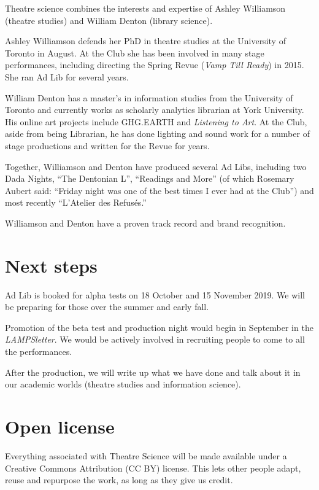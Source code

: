 \documentclass[12pt]{article}
\begin{document}
Theatre science combines the interests and expertise of Ashley Williamson (theatre studies) and William Denton (library science).

Ashley Williamson defends her PhD in theatre studies at the University of Toronto in August.  At the Club she has been involved in many stage performances, including directing the Spring Revue (\textit{Vamp Till Ready}) in 2015.  She ran Ad Lib for several years.

William Denton has a master's in information studies from the University of Toronto and currently works as scholarly analytics librarian at York University.  His online art projects include GHG.EARTH and \textit{Listening to Art}.  At the Club, aside from being Librarian, he has done lighting and sound work for a number of stage productions and written for the Revue for years.

Together, Williamson and Denton have produced several Ad Libs, including two Dada Nights, ``The Dentonian L'', ``Readings and More'' (of which Rosemary Aubert said: ``Friday night was one of the best times I ever had at the Club'') and most recently ``L'Atelier des Refusés.''

Williamson and Denton have a proven track record and brand recognition.

\section{Next steps}

Ad Lib is booked for alpha tests on 18 October and 15 November 2019.  We will be preparing for those over the summer and early fall.

Promotion of the beta test and production night would begin in September in the \textit{LAMPSletter}.  We would be actively involved in recruiting people to come to all the performances.

After the production, we will write up what we have done and talk about it in our academic worlds (theatre studies and information science).

\section{Open license}

Everything associated with Theatre Science will be made available under a Creative Commons Attribution (CC BY) license.  This lets other people adapt, reuse and repurpose the work, as long as they give us credit.
\end{document}
